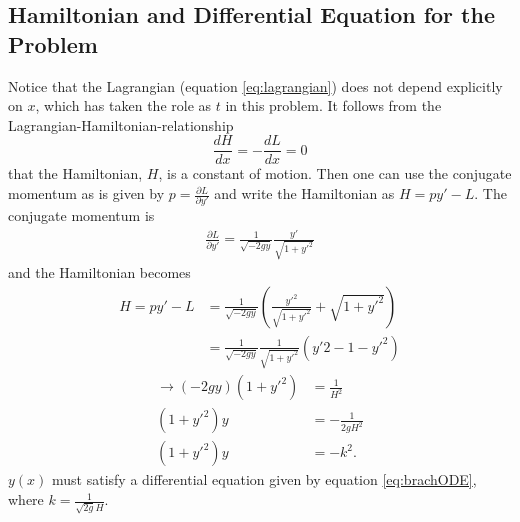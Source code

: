 \documentclass[11pt]{amsart}
\begin{document}
\subsection{Hamiltonian and Differential Equation for the Problem}
Notice that the Lagrangian (equation \ref{eq:lagrangian}) does not depend explicitly on $x$, which has taken the role as  $t$ in this problem. It follows from the Lagrangian-Hamiltonian-relationship
\begin{equation}
\frac{dH}{dx} = -\frac{dL}{dx} = 0
\end{equation}
that the Hamiltonian, $H$, is a constant of motion. Then one can use the conjugate momentum as is given by $p = \frac{\partial L}{\partial y'}$ and write the Hamiltonian as $H = py' - L$. The conjugate momentum is
\begin{align*}
\frac{\partial L}{\partial y'} = \frac{1}{\sqrt{-2gy}}\frac{y'}{\sqrt{1+y'^2}}
\end{align*}
and the Hamiltonian becomes
\begin{align*}
H = py' - L &= \frac{1}{\sqrt{-2gy}}\left(\frac{y'^2}{\sqrt{1+y'^2}} + \sqrt{1+y'^2} \right) \\
			&= \frac{1}{\sqrt{-2gy}}\frac{1}{\sqrt{1+y'^2}}\left(y'2 - 1 - y'^2 \right)
\end{align*}
\begin{align}
\to (-2gy)(1+y'^2) &= \frac{1}{H^2} \nonumber \\
(1 + y'^2)y &= -\frac{1}{2gH^2} \nonumber \\
(1 + y'^2)y &= -k^2 \label{eq:brachODE}.
\end{align}
$y(x)$ must satisfy a differential equation given by equation \ref{eq:brachODE}, where $k = \frac{1}{\sqrt{2g}H}$. 
\end{document}
